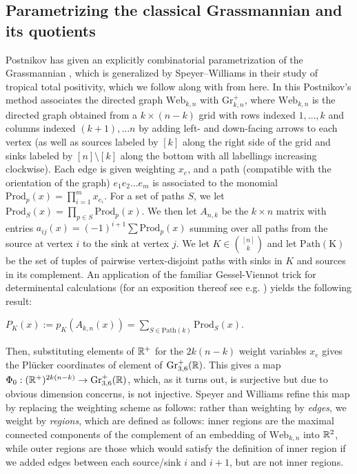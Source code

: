 \documentclass[12pt,letter]{article}
\newcommand{\gr}{\mathrm{Gr}}
\newcommand{\web}{\mathrm{Web}}
\newcommand{\prad}{\mathrm{Prod}}
\begin{document}
\subsection{Parametrizing the classical Grassmannian and its quotients}
Postnikov has given an explicitly combinatorial parametrization of the Grassmannian \cite{postnikov2006total}, which is generalized by Speyer--Williams \cite{WiSp05} in their study of tropical total positivity, which we follow along with from here. In this  Postnikov's method associates the directed graph $\web_{k,n}$ with $\gr^+_{k,n}$, where $\web_{k,n}$ is the directed graph obtained from a $k\times (n-k)$ grid with rows indexed $1,\hdots,k$ and columns indexed $(k+1),\hdots n$ by adding left- and down-facing arrows to each vertex (as well as sources labeled by $[k]$ along the right side of the grid and sinks labeled by $[n]\setminus [k]$ along the bottom with all labellings increasing clockwise). Each edge is given weighting $x_e$, and a path (compatible with the orientation of the graph) $e_1e_2\hdots e_m$ is associated to the monomial $\prad_p(x)=\prod_{i=1}^mx_{e_{i}}$. For a set of paths $S$, we let $\prad_S(x)=\prod_{p\in S}\prad_p(x)$. We then let $A_{n,k}$ be the $k\times n$ matrix with entries $a_{ij}(x)=(-1)^{i+1}\sum\prad_p(x)$ summing over all paths from the source at vertex $i$ to the sink at vertex $j$. We let $K\in {[n]\choose k}$ and let $\mathrm{Path(K)}$ be the set of tuples of pairwise vertex-disjoint paths with sinks in $K$ and sources in its complement. An application of the familiar  Gessel-Viennot trick for determinental calculations (for an exposition thereof see e.g. \cite[\S2.7]{stan}) yields the following result:\begin{proposition}
	$P_K(x):=p_K(A_{k,n}(x))=\sum_{S\in \mathrm{Path}(k)} \prad_S(x)$. 
\end{proposition}  
Then, substituting elements of ${\mathbb R}^+$ for the $2k(n-k)$ weight variables $x_e$ gives the Pl\"ucker coordinates of element of $\gr_{3,6}^+(\RR)$.
 This gives a map $\Phi_0:(\RR^+)^{2k(n-k)}\to \gr_{3,6}^+(\RR)$, which, as it turns out, is surjective but due to obvious dimension concerns, is not injective. Speyer and Williams refine this map by replacing the weighting scheme as follows:
  rather than weighting by \emph{edges}, we weight by \emph{regions}, which are defined as follows: inner regions are the maximal connected components of the complement of an embedding of $\web_{k,n}$ into ${\mathbb R}^2$, while outer regions are those which would satisfy the definition of inner region if we added edges between each source/sink $i$ and $i+1$, but are not inner regions.
\end{document}

